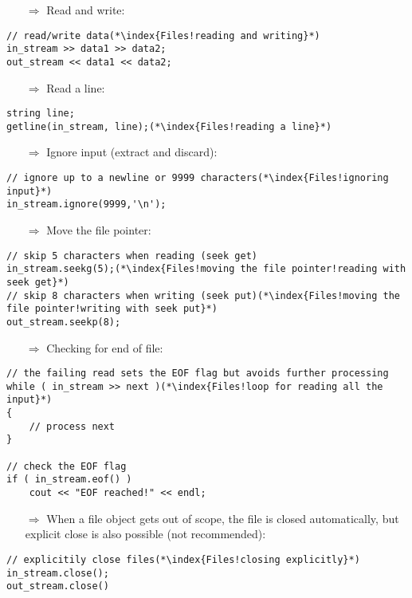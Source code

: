 \documentclass[10pt]{article}
\begin{document}
\begin{enumerate}
\item[$\Rightarrow$] Read and write:
\end{enumerate}
\begin{lstlisting}
// read/write data(*\index{Files!reading and writing}*)
in_stream >> data1 >> data2;
out_stream << data1 << data2;
\end{lstlisting}
\begin{enumerate}
\item[$\Rightarrow$] Read a line:
\end{enumerate}
\begin{lstlisting}
string line;
getline(in_stream, line);(*\index{Files!reading a line}*)
\end{lstlisting}
\begin{enumerate}
\item[$\Rightarrow$] Ignore input (extract and discard):
\end{enumerate}
\begin{lstlisting}
// ignore up to a newline or 9999 characters(*\index{Files!ignoring input}*)
in_stream.ignore(9999,'\n');
\end{lstlisting}
\begin{enumerate}
\item[$\Rightarrow$] Move the file pointer:
\end{enumerate}
\begin{lstlisting}
// skip 5 characters when reading (seek get)
in_stream.seekg(5);(*\index{Files!moving the file pointer!reading with seek get}*)
// skip 8 characters when writing (seek put)(*\index{Files!moving the file pointer!writing with seek put}*)
out_stream.seekp(8);
\end{lstlisting}
\begin{enumerate}
\item[$\Rightarrow$] Checking for end of file:
\end{enumerate}
\begin{lstlisting}
// the failing read sets the EOF flag but avoids further processing
while ( in_stream >> next )(*\index{Files!loop for reading all the input}*)
{
    // process next
}

// check the EOF flag
if ( in_stream.eof() )
    cout << "EOF reached!" << endl;
\end{lstlisting}
\begin{enumerate}
\item[$\Rightarrow$] When a file object gets out of scope, the file is closed automatically, but explicit
close is also possible (not recommended):
\end{enumerate}
\begin{lstlisting}
// explicitily close files(*\index{Files!closing explicitly}*)
in_stream.close();
out_stream.close()
\end{lstlisting}
%
%
\end{document}
